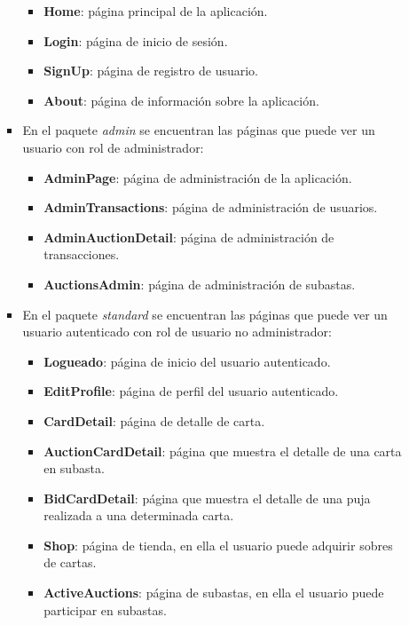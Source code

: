 \begin{itemize}
\begin{itemize}
\begin{itemize}
            \begin{itemize}
                \item \textbf{Home}: página principal de la aplicación.
                \item \textbf{Login}: página de inicio de sesión.
                \item \textbf{SignUp}: página de registro de usuario.
                \item \textbf{About}: página de información sobre la aplicación.
            \end{itemize}
             \item En el paquete \textit{admin} se encuentran las páginas que puede ver un usuario con rol de administrador:
            \begin{itemize}
                \item \textbf{AdminPage}: página de administración de la aplicación.
                \item \textbf{AdminTransactions}: página de administración de usuarios.
                \item \textbf{AdminAuctionDetail}: página de administración de transacciones.
                \item \textbf{AuctionsAdmin}: página de administración de subastas.
            \end{itemize}
            \item En el paquete \textit{standard} se encuentran las páginas que puede ver un usuario autenticado con rol de usuario no administrador:
            \begin{itemize}
                \item \textbf{Logueado}: página de inicio del usuario autenticado.
                \item \textbf{EditProfile}: página de perfil del usuario autenticado.
                \item \textbf{CardDetail}: página de detalle de carta.
                \item \textbf{AuctionCardDetail}: página que muestra el detalle de una carta en subasta.
                \item \textbf{BidCardDetail}: página que muestra el detalle de una puja realizada a una determinada carta.
                \item \textbf{Shop}: página de tienda, en ella el usuario puede adquirir sobres de cartas.
                \item \textbf{ActiveAuctions}: página de subastas, en ella el usuario puede participar en subastas.

\end{itemize}
\end{itemize}
\end{itemize}
\end{itemize}
